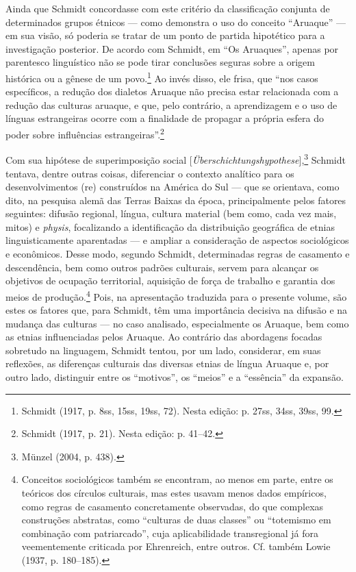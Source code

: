 Ainda que Schmidt concordasse com este critério da classificação
conjunta de determinados grupos étnicos --- como demonstra o uso do
conceito ``Aruaque'' --- em sua visão, só poderia se tratar de um ponto
de partida hipotético para a investigação posterior. De acordo com
Schmidt, em ``Os Aruaques'', apenas por parentesco linguístico não se
pode tirar conclusões seguras sobre a origem histórica ou a gênese de um
povo.\footnote{Schmidt (1917, p. 8ss, 15ss, 19ss, 72). Nesta edição: p.
  27ss, 34ss, 39ss, 99.} Ao invés disso, ele frisa, que ``nos casos
específicos, a redução dos dialetos Aruaque não precisa estar
relacionada com a redução das culturas aruaque, e que, pelo contrário, a
aprendizagem e o uso de línguas estrangeiras ocorre com a finalidade de
propagar a própria esfera do poder sobre influências
estrangeiras''.\footnote{Schmidt (1917, p. 21). Nesta edição: p. 41--42.}

Com sua hipótese de superimposição social
{[}\emph{Überschichtungshypothese}{]},\footnote{Münzel (2004, p. 438).}
Schmidt tentava, dentre outras coisas, diferenciar o contexto analítico
para os desenvolvimentos (re) construídos na América do Sul --- que se
orientava, como dito, na pesquisa alemã das Terras Baixas da época,
principalmente pelos fatores seguintes: difusão regional, língua,
cultura material (bem como, cada vez mais, mitos) e \emph{physis},
focalizando a identificação da distribuição geográfica de etnias
linguisticamente aparentadas --- e ampliar a consideração de aspectos
sociológicos e econômicos. Desse modo, segundo Schmidt, determinadas
regras de casamento e descendência, bem como outros padrões culturais,
servem para alcançar os objetivos de ocupação territorial, aquisição de
força de trabalho e garantia dos meios de produção.\footnote{Conceitos
  sociológicos também se encontram, ao menos em parte, entre os teóricos
  dos círculos culturais, mas estes usavam menos dados empíricos, como
  regras de casamento concretamente observadas, do que complexas
  construções abstratas, como ``culturas de duas classes'' ou
  ``totemismo em combinação com patriarcado'', cuja aplicabilidade
  transregional já fora veementemente criticada por Ehrenreich, entre
  outros. Cf. também Lowie (1937, p. 180--185).} Pois, na apresentação
traduzida para o presente volume, são estes os fatores que, para
Schmidt, têm uma importância decisiva na difusão e na mudança das
culturas --- no caso analisado, especialmente os Aruaque, bem como as
etnias influenciadas pelos Aruaque. Ao contrário das abordagens focadas
sobretudo na linguagem, Schmidt tentou, por um lado, considerar, em
suas reflexões, as diferenças culturais das diversas etnias de língua
Aruaque e, por outro lado, distinguir entre os ``motivos'', os ``meios''
e a ``essência'' da expansão.

